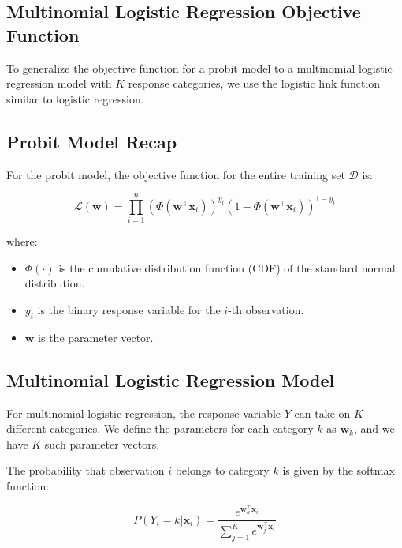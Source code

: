 \documentclass[12pt]{article}
\begin{document}
\begin{enumerate}
\section*{Multinomial Logistic Regression Objective Function}

To generalize the objective function for a probit model to a multinomial logistic regression model with \( K \) response categories, we use the logistic link function similar to logistic regression.

\subsection*{Probit Model Recap}

For the probit model, the objective function for the entire training set \(\mathcal{D}\) is:

\begin{equation}
\mathcal{L}(\mathbf{w}) = \prod_{i=1}^n \left( \Phi(\mathbf{w}^\top \mathbf{x}_i) \right)^{y_i} \left( 1 - \Phi(\mathbf{w}^\top \mathbf{x}_i) \right)^{1 - y_i}
\end{equation}

where:
\begin{itemize}
    \item \(\Phi(\cdot)\) is the cumulative distribution function (CDF) of the standard normal distribution.
    \item \( y_i \) is the binary response variable for the \( i \)-th observation.
    \item \(\mathbf{w}\) is the parameter vector.
\end{itemize}

\subsection*{Multinomial Logistic Regression Model}

For multinomial logistic regression, the response variable \( Y \) can take on \( K \) different categories. We define the parameters for each category \( k \) as \(\mathbf{w}_k\), and we have \( K \) such parameter vectors.

The probability that observation \( i \) belongs to category \( k \) is given by the softmax function:

\begin{equation}
P(Y_i = k | \mathbf{x}_i) = \frac{e^{\mathbf{w}_k^\top \mathbf{x}_i}}{\sum_{j=1}^K e^{\mathbf{w}_j^\top \mathbf{x}_i}}
\end{equation}


\end{enumerate}
\end{document}

